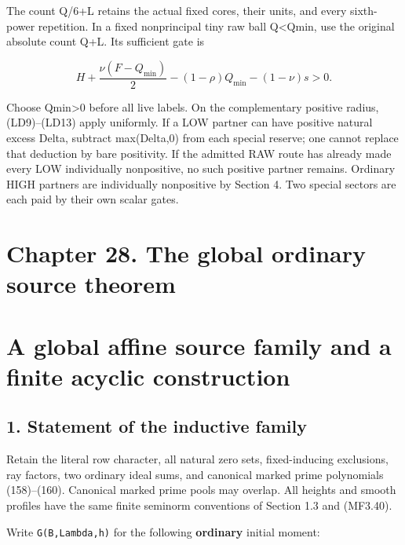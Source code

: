 The count Q/6+L retains the actual fixed cores, their units, and every sixth-power repetition. In a fixed nonprincipal tiny raw ball Q\textless Qmin, use the original absolute count Q+L. Its sufficient gate is

\[
 H+\frac{\nu(F-Q_{\min})}{2}
           -(1-\rho)Q_{\min}-(1-\nu)s>0.           \tag{LD17}
\]

Choose Qmin\textgreater0 before all live labels. On the complementary positive radius, (LD9)--(LD13) apply uniformly. If a LOW partner can have positive natural excess Delta, subtract max(Delta,0) from each special reserve; one cannot replace that deduction by bare positivity. If the admitted RAW route has already made every LOW individually nonpositive, no such positive partner remains. Ordinary HIGH partners are individually nonpositive by Section 4. Two special sectors are each paid by their own scalar gates.

\hypertarget{sources:chapter-28.-the-global-ordinary-source-theorem}{%
\section{Chapter 28. The global ordinary source theorem}\label{sources:chapter-28.-the-global-ordinary-source-theorem}}

\hypertarget{sources:a-global-affine-source-family-and-a-finite-acyclic-construction}{%
\section{A global affine source family and a finite acyclic construction}\label{sources:a-global-affine-source-family-and-a-finite-acyclic-construction}}

\hypertarget{sources:statement-of-the-inductive-family}{%
\subsection{1. Statement of the inductive family}\label{sources:statement-of-the-inductive-family}}

Retain the literal row character, all natural zero sets, fixed-inducing exclusions, ray factors, two ordinary ideal sums, and canonical marked prime polynomials (158)--(160). Canonical marked prime pools may overlap. All heights and smooth profiles have the same finite seminorm conventions of Section 1.3 and (MF3.40).

Write \texttt{G(B,Lambda,h)} for the following \textbf{ordinary} initial moment:

